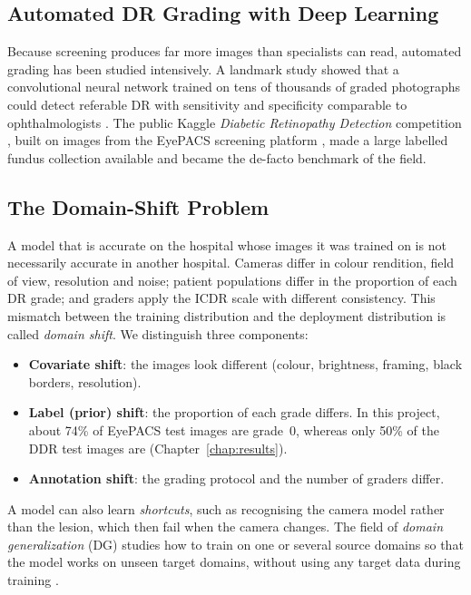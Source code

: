 \subsection{Automated DR Grading with Deep Learning}
\label{subsec:dl_grading}

Because screening produces far more images than specialists can read, automated grading has been studied intensively. A landmark study showed that a convolutional neural network trained on tens of thousands of graded photographs could detect referable DR with sensitivity and specificity comparable to ophthalmologists \cite{gulshan2016}. The public Kaggle \emph{Diabetic Retinopathy Detection} competition \cite{kagglecomp2015}, built on images from the EyePACS screening platform \cite{eyepacs2009}, made a large labelled fundus collection available and became the de-facto benchmark of the field.

\subsection{The Domain-Shift Problem}
\label{subsec:domain_shift_bg}

A model that is accurate on the hospital whose images it was trained on is not necessarily accurate in another hospital. Cameras differ in colour rendition, field of view, resolution and noise; patient populations differ in the proportion of each DR grade; and graders apply the ICDR scale with different consistency. This mismatch between the training distribution and the deployment distribution is called \emph{domain shift}. We distinguish three components:

\begin{itemize}[leftmargin=1.5em]
    \item \textbf{Covariate shift}: the images look different (colour, brightness, framing, black borders, resolution).
    \item \textbf{Label (prior) shift}: the proportion of each grade differs. In this project, about 74\% of EyePACS test images are grade~0, whereas only 50\% of the DDR test images are (Chapter~\ref{chap:results}).
    \item \textbf{Annotation shift}: the grading protocol and the number of graders differ.
\end{itemize}

A model can also learn \emph{shortcuts}, such as recognising the camera model rather than the lesion, which then fail when the camera changes. The field of \emph{domain generalization} (DG) studies how to train on one or several source domains so that the model works on unseen target domains, without using any target data during training \cite{dgsurvey2023}.

